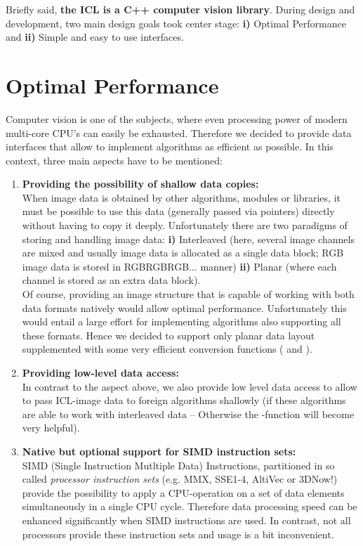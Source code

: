 Briefly said, \textbf{the ICL is a C++ computer vision library}. During design and development, two main design goals took center stage: \small{\textbf{i)}} Optimal Performance and \small{\textbf{ii)}} Simple and easy to use interfaces.
\section{Optimal Performance} 
Computer vision is one of the subjects, where even processing power of modern multi-core CPU's can easily be exhausted. Therefore we decided to provide data interfaces that allow to implement algorithms as efficient as possible. In this context, three main aspects have to be mentioned:
\begin{enumerate}
\item \textbf{Providing the possibility of shallow data copies:}\\
When image data is obtained by other algorithms, modules or libraries, it must be possible to use this data (generally passed via pointers) directly without having to copy it deeply. Unfortunately there are two paradigms of storing and handling image data: \small{\textbf{i)}} Interleaved (here, several image channels are mixed and usually image data is allocated as a single data block; RGB image data is stored in RGBRGBRGB... manner) \small{\textbf{ii)}} Planar (where each channel is stored as an extra data block).\\
Of course, providing an image structure that is capable of working with both data formats natively would allow optimal performance. Unfortunately this would entail a large effort for implementing algorithms also supporting all these formats. Hence we decided to support only planar data layout supplemented with some very efficient conversion functions ( and ).
\item \textbf{Providing low-level data access:}\\
In contrast to the aspect above, we also provide low level data access to allow to pass ICL-image data to foreign algorithms shallowly (if these algorithms are able to work with interleaved data -- Otherwise the -function will become very helpful).
\item \textbf{Native but optional support for SIMD instruction sets:}\\
SIMD (Single Instruction Mutltiple Data) Instructions, partitioned in so called \emph{processor instruction sets} (e.g. MMX, SSE1-4, AltiVec or 3DNow!) provide the possibility to apply a CPU-operation on a set of data elements simultaneously in a single CPU cycle. Therefore data processing speed can be enhanced significantly when SIMD instructions are used. In contrast, not all processors provide these instruction sets and usage is a bit inconvenient.\\

\end{enumerate}
